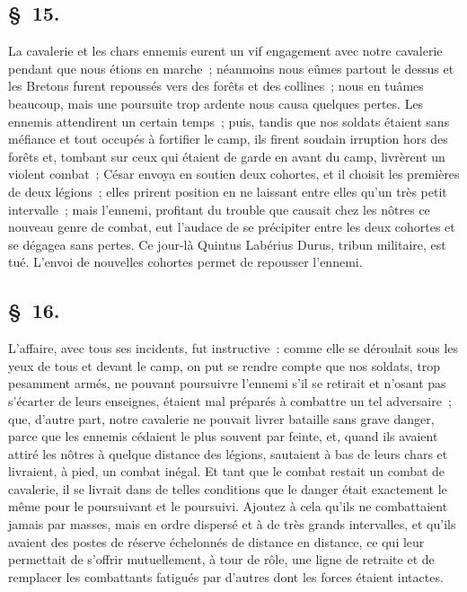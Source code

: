 \documentclass[french,twoside]{book} %
\begin{document}
\subsection[{§ 15.}]{ \textsc{§ 15.} }
\noindent La cavalerie et les chars ennemis eurent un vif engagement avec notre cavalerie pendant que nous étions en marche ; néanmoins nous eûmes partout le dessus et les Bretons furent repoussés vers des forêts et des collines ; nous en tuâmes beaucoup, mais une poursuite trop ardente nous causa quelques pertes. Les ennemis attendirent un certain temps ; puis, tandis que nos soldats étaient sans méfiance et tout occupés à fortifier le camp, ils firent soudain irruption hors des forêts et, tombant sur ceux qui étaient de garde en avant du camp, livrèrent un violent combat ; César envoya en soutien deux cohortes, et il choisit les premières de deux légions ; elles prirent position en ne laissant entre elles qu’un très petit intervalle ; mais l’ennemi, profitant du trouble que causait chez les nôtres ce nouveau genre de combat, eut l’audace de se précipiter entre les deux cohortes et se dégagea sans pertes. Ce jour-là Quintus Labérius Durus, tribun militaire, est tué. L'envoi de nouvelles cohortes permet de repousser l’ennemi.
\subsection[{§ 16.}]{ \textsc{§ 16.} }
\noindent L'affaire, avec tous ses incidents, fut instructive : comme elle se déroulait sous les yeux de tous et devant le camp, on put se rendre compte que nos soldats, trop pesamment armés, ne pouvant poursuivre l’ennemi s’il se retirait et n’osant pas s’écarter de leurs enseignes, étaient mal préparés à combattre un tel adversaire ; que, d’autre part, notre cavalerie ne pouvait livrer bataille sans grave danger, parce que les ennemis cédaient le plus souvent par feinte, et, quand ils avaient attiré les nôtres à quelque distance des légions, sautaient à bas de leurs chars et livraient, à pied, un combat inégal. Et tant que le combat restait un combat de cavalerie, il se livrait dans de telles conditions que le danger était exactement le même pour le poursuivant et le poursuivi. Ajoutez à cela qu’ils ne combattaient jamais par masses, mais en ordre dispersé et à de très grands intervalles, et qu’ils avaient des postes de réserve échelonnés de distance en distance, ce qui leur permettait de s’offrir mutuellement, à tour de rôle, une ligne de retraite et de remplacer les combattants fatigués par d’autres dont les forces étaient intactes.
\end{document}
